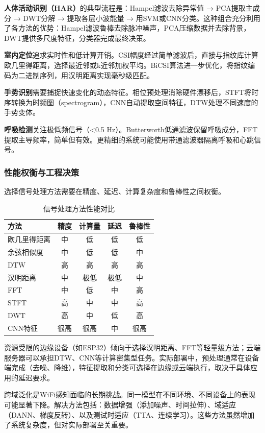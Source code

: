 \textbf{人体活动识别（HAR）}的典型流程是：Hampel滤波去除异常值 → PCA提取主成分 → DWT分解 → 提取各层小波能量 → 用SVM或CNN分类。这种组合充分利用了各方法的优势：Hampel滤波鲁棒去除脉冲噪声，PCA压缩数据并去除背景，DWT提供多尺度特征，分类器完成最终决策。

\textbf{室内定位}追求实时性和低计算开销。CSI幅度经过简单滤波后，直接与指纹库计算欧几里得距离，选择最近邻或k近邻加权平均。BiCSI算法进一步优化，将指纹编码为二进制序列，用汉明距离实现毫秒级匹配。

\textbf{手势识别}需要捕捉快速变化的动态特征。相位预处理消除硬件漂移后，STFT将时序转换为时频图（spectrogram），CNN自动提取空间特征，DTW处理不同速度的手势变体。

\textbf{呼吸检测}关注极低频信号（<0.5 Hz）。Butterworth低通滤波保留呼吸成分，FFT提取主导频率，简单但有效。更精细的系统可能使用带通滤波器隔离呼吸和心跳信号。

\subsubsection{性能权衡与工程决策}

选择信号处理方法需要在精度、延迟、计算复杂度和鲁棒性之间权衡。

\begin{table}[htbp]
    \centering
    \caption{信号处理方法性能对比}
    \label{tab:method-comparison}
    \begin{tabular}{|l|c|c|c|c|}
        \hline
        \textbf{方法} & \textbf{精度} & \textbf{计算量} & \textbf{延迟} & \textbf{鲁棒性} \\
        \hline
        欧几里得距离 & 中 & 低 & 低 & 低 \\
        余弦相似度 & 中 & 低 & 低 & 中 \\
        DTW & 高 & 高 & 高 & 高 \\
        汉明距离 & 中 & 极低 & 极低 & 中 \\
        FFT & 中 & 低 & 中 & 高 \\
        STFT & 高 & 中 & 中 & 高 \\
        DWT & 高 & 中 & 低 & 高 \\
        CNN特征 & 很高 & 很高 & 中 & 很高 \\
        \hline
    \end{tabular}
\end{table}

资源受限的边缘设备（如ESP32）倾向于选择汉明距离、FFT等轻量级方法；云端服务器可以承担DTW、CNN等计算密集型任务。实际部署中，预处理通常在设备端完成（去噪、降维），特征提取和分类可选择在边缘或云端执行，取决于具体应用的延迟要求。

跨域泛化是WiFi感知面临的长期挑战。同一模型在不同环境、不同设备上的表现可能显著下降。解决方法包括：数据增强（添加噪声、时间拉伸）、域适应（DANN、梯度反转）、以及测试时适应（TTA、连续学习）。这些方法虽然增加了系统复杂度，但对实际部署至关重要。
